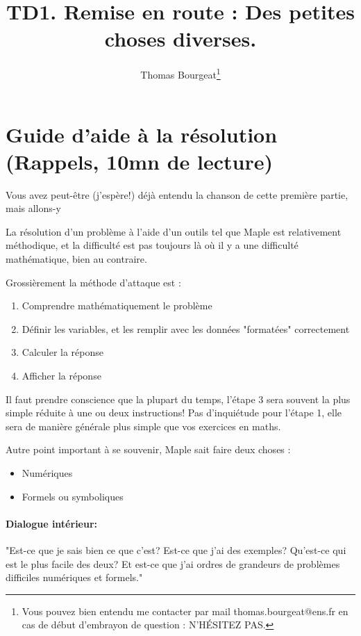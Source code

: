 \documentclass[10pt,a4paper]{article}
\begin{document}
\title{TD1. Remise en route : Des petites choses diverses.}
\author{Thomas Bourgeat\footnote{Vous pouvez bien entendu me contacter par mail thomas.bourgeat@ens.fr en cas de début d'embrayon de question : N'HÉSITEZ PAS.}}
\maketitle{}

\section{Guide d'aide à la résolution (Rappels, 10mn de lecture)}

Vous avez peut-être (j'espère!) déjà entendu la chanson de cette première partie, mais allons-y

La résolution d'un problème à l'aide d'un outils tel que Maple est relativement méthodique, et la difficulté est pas toujours là 
où il y a une difficulté mathématique, bien au contraire.

Grossièrement la méthode d'attaque est :
\begin{enumerate}
\item Comprendre mathématiquement le problème
\item Définir les variables, et les remplir avec les données "formatées" correctement
\item Calculer la réponse
\item Afficher la réponse
\end{enumerate}

Il faut prendre conscience que la plupart du temps, l'étape 3 sera souvent la plus simple réduite à une ou deux instructions! Pas d'inquiétude pour l'étape 1, elle sera de manière générale plus simple que vos exercices en maths.

Autre point important à se souvenir, Maple sait faire deux choses :
\begin{itemize}
\item Numériques
\item Formels ou symboliques
\end{itemize}

\paragraph{Dialogue intérieur:} "Est-ce que je sais bien ce que c'est? Est-ce que j'ai des exemples? Qu'est-ce qui est le plus facile des deux? Et est-ce que j'ai ordres de grandeurs de problèmes difficiles numériques et formels."
\end{document}
